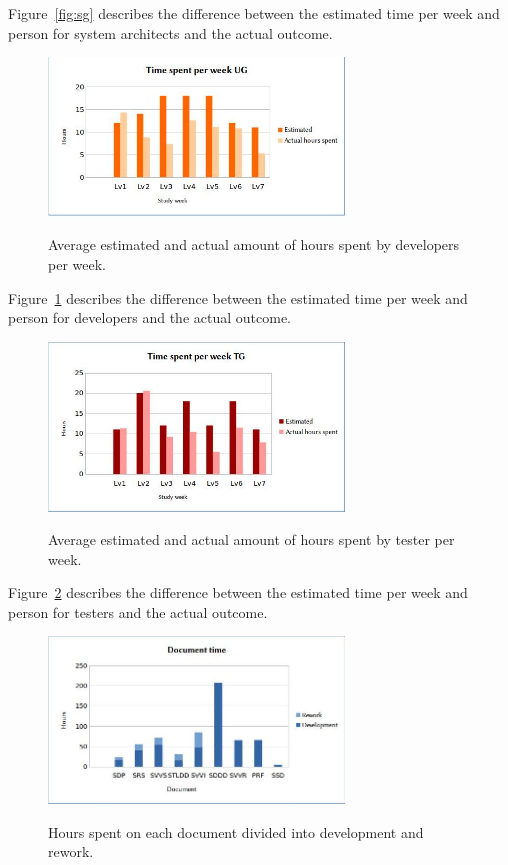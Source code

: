 \documentclass[a4paper]{article}
\begin{document}
Figure~\ref{fig:sg} describes the difference between the estimated time per week and person for system architects and the actual outcome. 


\begin{figure}[h!]
\centering
\includegraphics[width=0.7\textwidth]{ug.jpg}
\label{fig:ug}
\caption{Average estimated and actual amount of hours spent by developers per week.}
\end{figure}

Figure~\ref{fig:ug} describes the difference between the estimated time per week and person for developers and the actual outcome. 


\begin{figure}[h!]
\centering
\includegraphics[width=0.7\textwidth]{tg.jpg}
\label{fig:tg}
\caption{Average estimated and actual amount of hours spent by tester per week.}
\end{figure}

Figure~\ref{fig:tg} describes the difference between the estimated time per week and person for testers and the actual outcome. 

\begin{figure}[h!]
\centering
\includegraphics[width=0.7\textwidth]{dev-re.jpg}
\label{fig:dev-re}
\caption{Hours spent on each document divided into development and rework.}
\end{figure}
\end{document}
